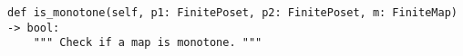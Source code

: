 \begin{verbatim}
def is_monotone(self, p1: FinitePoset, p2: FinitePoset, m: FiniteMap) -> bool:
    """ Check if a map is monotone. """
\end{verbatim}